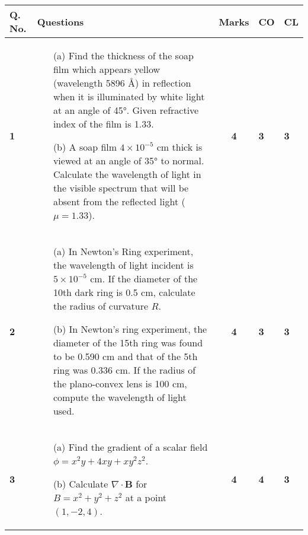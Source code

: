 \documentclass[a4paper,12pt]{article}
\begin{document}
\begin{center}
\begin{tabular}{|p{0.5cm}|p{13cm}|c|p{0.5cm}|p{0.5cm}|}
\hline
\textbf{Q. No.} & \centering \textbf{Questions} & \textbf{Marks} & \textbf{CO} & \textbf{CL} \\
\hline

\begin{center} \textbf{1} \end{center}	&  
\begin{enumerate}
\item[(a)] Find the thickness of the soap film which appears yellow (wavelength 5896 Å) in reflection when it is illuminated by white light at an angle of 45°. Given refractive index of the film is 1.33.

\item[(b)] A soap film $4 \times 10^{-5}$ cm thick is viewed at an angle of 35° to normal. Calculate the wavelength of light in the visible spectrum that will be absent from the reflected light ($\mu = 1.33$).
\end{enumerate}  & \textbf{4} & \textbf{3} &  \textbf{3} \\

\hline

\begin{center} \textbf{2} \end{center}	&  
\begin{enumerate}
\item[(a)]  In Newton’s Ring experiment, the wavelength of light incident is $5 \times 10^{-5}$ cm. If the diameter of the 10th dark ring is 0.5 cm, calculate the radius of curvature $R$. 

\item[(b)] In Newton's ring experiment, the diameter of the 15th ring was found to be 0.590 cm and that of the 5th ring was 0.336 cm. If the radius of the plano-convex lens is 100 cm, compute the wavelength of light used. 
\end{enumerate} & \textbf{4} & \textbf{3} & \textbf{3} \\

\hline

\begin{center} \textbf{3} \end{center}	& 
\begin{enumerate}
\item[(a)]  Find the gradient of a scalar field $\phi = x^2y + 4xy + xy^2z^2$. 

\item[(b)] Calculate $\nabla \cdot \mathbf{B}$ for $B = x^2 + y^2 + z^2$ at a point $(1, -2, 4)$.
\end{enumerate} & \textbf{4} & \textbf{4} & \textbf{3} \\
\hline


\end{tabular}
\end{center}
\end{document}
